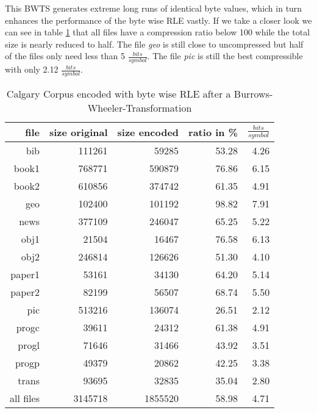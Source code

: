 \par{
This BWTS generates extreme long runs of identical byte values, which in turn enhances the performance of the byte wise RLE vastly. If we take a closer look we can see in table \ref{tab:t14:Calgary Corpus encoded with byte wise RLE after a Burrows-Wheeler-Transformation} that all files have a compression ratio below 100 while the total size is nearly reduced to half. The file \textit{geo} is still close to uncompressed but half of the files only need less than 5 $\frac{bits}{symbol}$. The file \textit{pic} is still the best compressible with only 2.12 $\frac{bits}{symbol}$.
\begin{table}[H]
	\centering
	\begin{tabular}{r|r|r|r|r}	
		file & size original & size encoded & ratio in \% & $\frac{bits}{symbol}$\\
		\hline
bib & 111261 & 59285 & 53.28 & 4.26 \\
book1 & 768771 & 590879 & 76.86 & 6.15 \\
book2 & 610856 & 374742 & 61.35 & 4.91 \\
geo & 102400 & 101192 & 98.82 & 7.91 \\
news & 377109 & 246047 & 65.25 & 5.22 \\
obj1 & 21504 & 16467 & 76.58 & 6.13 \\
obj2 & 246814 & 126626 & 51.30 & 4.10 \\
paper1 & 53161 & 34130 & 64.20 & 5.14 \\
paper2 & 82199 & 56507 & 68.74 & 5.50 \\
pic & 513216 & 136074 & 26.51 & 2.12 \\
progc & 39611 & 24312 & 61.38 & 4.91 \\
progl & 71646 & 31466 & 43.92 & 3.51 \\
progp & 49379 & 20862 & 42.25 & 3.38 \\
trans & 93695 & 32835 & 35.04 & 2.80 \\
\hline
all files & 3145718 & 1855520 & 58.98 & 4.71
	\end{tabular}
	\caption{Calgary Corpus encoded with byte wise RLE after a Burrows-Wheeler-Transformation}
	\label{tab:t14:Calgary Corpus encoded with byte wise RLE after a Burrows-Wheeler-Transformation}
\end{table}
}
